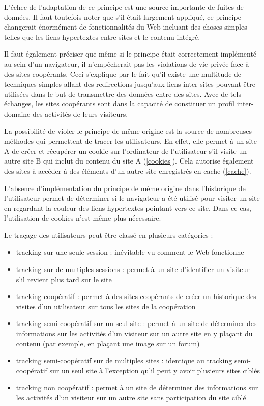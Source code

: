L'échec de l'adaptation de ce principe est une source importante de fuites de données. Il faut toutefois noter que s'il était largement appliqué, ce principe changerait énormément de fonctionnalités du Web incluant des choses simples telles que les liens hypertextes entre sites et le contenu intégré.
\newline

Il faut également préciser que même si le principe était correctement implémenté au sein d'un navigateur, il n'empêcherait pas les violations de vie privée face à des sites coopérants. Ceci s'explique par le fait qu'il existe une multitude de techniques simples allant des redirections jusqu'aux liens inter-sites pouvant être utilisées dans le but de transmettre des données entre des sites. Avec de tels échanges, les sites coopérants sont dans la capacité de constituer un profil inter-domaine des activités de leurs visiteurs.
\newline

La possibilité de violer le principe de même origine est la source de nombreuses méthodes qui permettent de tracer les utilisateurs.
En effet, elle permet à un site A de créer et récupérer un cookie sur l'ordinateur de l'utilisateur s'il visite un autre site B qui inclut du contenu du site A (\autoref{cookies}). Cela autorise également des sites à accéder à des éléments d'un autre site enregistrés en cache (\autoref{cache}).

L'absence d'implémentation du principe de même origine dans l'historique de l'utilisateur permet de déterminer si le navigateur a été utilisé pour visiter un site en regardant la couleur des liens hypertextes pointant vers ce site. Dans ce cas, l'utilisation de cookies n'est même plus nécessaire.
\newline

Le traçage des utilisateurs peut être classé en plusieurs catégories \cite{Jackson:2006:PBS:1135777.1135884} :
\begin{itemize}
  \item tracking sur une seule session : inévitable vu comment le Web fonctionne
  \item tracking sur de multiples sessions : permet à un site d'identifier un visiteur s'il revient plus tard sur le site
  \item tracking coopératif : permet à des sites coopérants de créer un historique des visites d'un utilisateur sur tous les sites de la coopération
  \item tracking semi-coopératif sur un seul site : permet à un site de déterminer des informations sur les activités d'un visiteur sur un autre site en y plaçant du contenu (par exemple, en plaçant une image sur un forum)
  \item tracking semi-coopératif sur de multiples sites : identique au tracking semi-coopératif sur un seul site à l'exception qu'il peut y avoir plusieurs sites ciblés
  \item tracking non coopératif : permet à un site de déterminer des informations sur les activités d'un visiteur sur un autre site sans participation du site ciblé
  \newline
\end{itemize}

